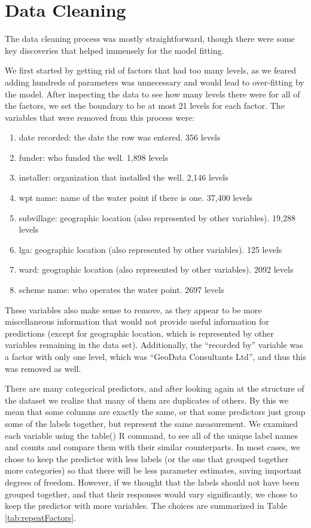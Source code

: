 \section{Data Cleaning} \label{dataClean}
The data cleaning process was mostly straightforward, though there were some key discoveries that helped immensely for the model fitting.

We first started by getting rid of factors that had too many levels, as we feared adding hundreds of parameters was unnecessary and would lead to over-fitting by the model.  After inspecting the data to see how many levels there were for all of the factors, we set the boundary to be at most 21 levels for each factor.  The variables that were removed from this process were:

\begin{enumerate}
    \item date recorded: the date the row was entered. 356 levels
    \item funder: who funded the well. 1,898 levels
    \item installer: organization that installed the well. 2,146 levels
    \item wpt name: name of the water point if there is one. 37,400 levels
    \item subvillage: geographic location (also represented by other variables). 19,288 levels
    \item lga: geographic location (also represented by other variables). 125 levels
    \item ward: geographic location (also represented by other variables). 2092 levels
    \item scheme name: who operates the water point. 2697 levels
\end{enumerate}

These variables also make sense to remove, as they appear to be more miscellaneous information that would not provide useful information for predictions (except for geographic location, which is represented by other variables remaining in the data set).  Additionally, the ``recorded by'' variable was a factor with only one level, which was ``GeoData Consultants Ltd'', and thus this was removed as well.

There are many categorical predictors, and after looking again at the structure of the dataset we realize that many of them are duplicates of others.  By this we mean that some columns are exactly the same, or that some predictors just group some of the labels together, but represent the same measurement.  We examined each variable using the table() R command, to see all of the unique label names and counts and compare them with their similar counterparts.  In most cases, we chose to keep the predictor with less labels (or the one that grouped together more categories) so that there will be less parameter estimates, saving important degrees of freedom.  However, if we thought that the labels should not have been grouped together, and that their responses would vary significantly, we chose to keep the predictor with more variables.  The choices are summarized in Table \ref{tab:repeatFactors}.

